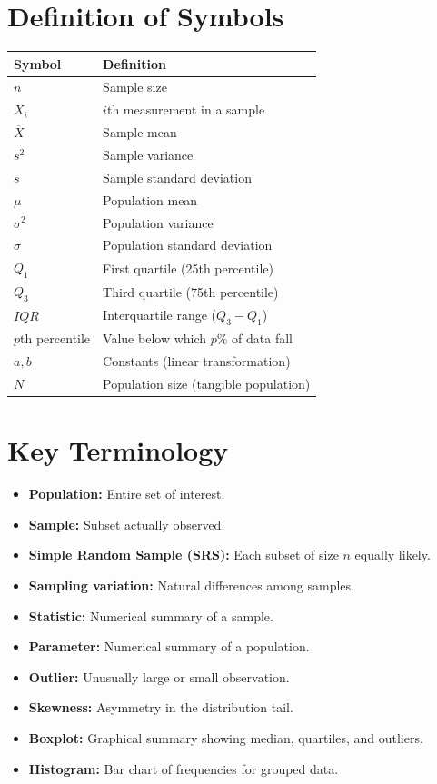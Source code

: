 \documentclass[11pt]{article}
\begin{document}
\section*{Definition of Symbols}
{\small
\begin{center}
\begin{tabular}{l l}
\toprule
\textbf{Symbol} & \textbf{Definition} \\
\midrule
\(n\) & Sample size \\
\(X_i\) & \(i\)th measurement in a sample \\
\(\overline{X}\) & Sample mean \\
\(s^2\) & Sample variance \\
\(s\) & Sample standard deviation \\
\(\mu\) & Population mean \\
\(\sigma^2\) & Population variance \\
\(\sigma\) & Population standard deviation \\
\(Q_1\) & First quartile (25th percentile) \\
\(Q_3\) & Third quartile (75th percentile) \\
\(IQR\) & Interquartile range (\(Q_3-Q_1\)) \\
\(p\)th percentile & Value below which \(p\%\) of data fall \\
\(a, b\) & Constants (linear transformation) \\
\(N\) & Population size (tangible population) \\
\bottomrule
\end{tabular}
\end{center}
}

\section*{Key Terminology}
\begin{itemize}[nosep]
    \item \textbf{Population:} Entire set of interest.
    \item \textbf{Sample:} Subset actually observed.
    \item \textbf{Simple Random Sample (SRS):} Each subset of size \(n\) equally likely.
    \item \textbf{Sampling variation:} Natural differences among samples.
    \item \textbf{Statistic:} Numerical summary of a sample.
    \item \textbf{Parameter:} Numerical summary of a population.
    \item \textbf{Outlier:} Unusually large or small observation.
    \item \textbf{Skewness:} Asymmetry in the distribution tail.
    \item \textbf{Boxplot:} Graphical summary showing median, quartiles, and outliers.
    \item \textbf{Histogram:} Bar chart of frequencies for grouped data.
\end{itemize}
\end{document}
